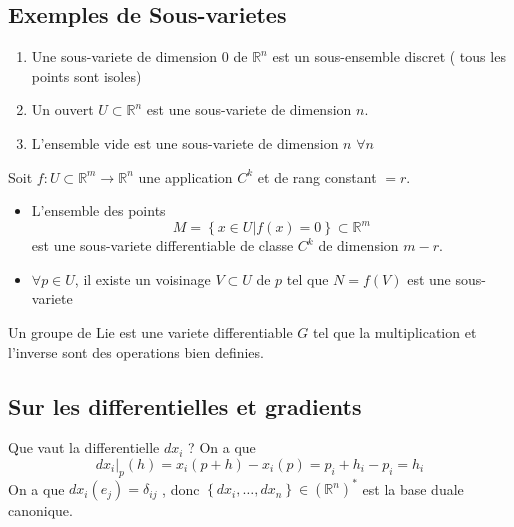 \documentclass[../main.tex]{subfiles}
\begin{document}
\subsection{Exemples de Sous-varietes}
\begin{enumerate}
\item Une sous-variete de dimension $0$ de $ \mathbb{R}^n$ est un sous-ensemble discret ( tous les points sont isoles) 
\item Un ouvert $U \subset \mathbb{R}^n$ est une sous-variete de dimension $n$.
\item L'ensemble vide est une sous-variete de dimension $n$ $\forall n$
\end{enumerate}
\begin{thm}
	Soit $f:U \subset  \mathbb{R}^m\to \mathbb{R}^n$ une application $C^{k}$ et de rang constant $=r$.\\
	\begin{itemize}
	\item L'ensemble des points 
		\[ 
		M= \left\{ x\in U | f( x) =0 \right\} \subset \mathbb{R}^m
		\]
		est une sous-variete differentiable de classe $C^{k}$ de dimension $m-r$.
	
	\item $\forall p\in U$, il existe un voisinage $V \subset U$ de $p$ tel que $N= f( V) $ est une sous-variete	
	\end{itemize}

\end{thm}
\begin{defn}
	Un groupe de Lie est une variete differentiable $G$  tel que la multiplication et l'inverse sont des operations bien definies.
\end{defn}
\subsection{Sur les differentielles et gradients}
Que vaut la differentielle  $dx_i$ ?
On a que
\[ 
dx_i\vert_p( h) =  x_i( p+h) -x_i( p) = p_i+h_i - p_i = h_i
\]
On a que $dx_i ( e_j) = \delta_{ij} $ , donc $ \left\{ dx_i,\ldots, dx_n \right\}\in ( \mathbb{R}^n) ^{*} $ est la base duale canonique.

	
\end{document}
